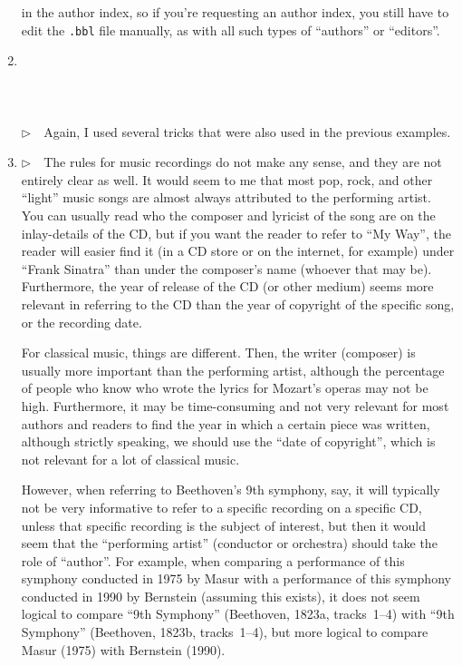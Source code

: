 \documentclass{article}
\newcommand{\EM}{\ensuremath{\triangleright\quad}}
\newcommand{\fname}[1]{\texttt{#1}}%
\begin{document}
\begin{enumerate}
      in the author index, so if you're requesting an author index,
      you still have to edit the \fname{.bbl} file manually, as with
      all such types of ``authors'' or ``editors''.
\item \cite{ex68} \\ \cite{ex68}\\ \\ \\
      \EM Again, I used several tricks that were also used in the previous
      examples.
\item \EM The rules for music recordings do not make any sense, and they
      are not entirely clear as well. It would seem to me that
      most pop, rock, and other ``light'' music songs are almost always
      attributed to the performing artist. You can usually read who the
      composer and lyricist of the song are on the inlay-details
      of the CD, but if you want the reader to refer to ``My Way'',
      the reader will easier find it (in a CD store or on the
      internet, for example) under ``Frank Sinatra'' than under
      the composer's name (whoever that may be). Furthermore, the
      year of release of the CD (or other medium) seems more relevant
      in referring to the CD than the year of copyright of the
      specific song, or the recording date.

      For classical music, things are different. Then, the writer (composer)
      is usually more important than the performing artist, although
      the percentage of people who know who wrote the lyrics for
      Mozart's operas may not be high. Furthermore, it may be
      time-consuming and not very relevant for most authors and
      readers to find the year in which a certain piece was written,
      although strictly speaking, we should use the ``date of copyright'',
      which is not relevant for a lot of classical music.

      However, when referring to Beethoven's 9th symphony, say, it will
      typically not be very informative to refer to a specific recording on a
      specific CD, unless that specific recording is the subject of interest,
      but then it would seem that the ``performing artist'' (conductor or
      orchestra) should take the role of ``author''. For example, when
      comparing a performance of this symphony conducted in 1975 by Masur with
      a performance of this symphony conducted in 1990 by Bernstein (assuming
      this exists), it does not seem logical to compare ``9th Symphony''
      (Beethoven, 1823a, tracks~1--4) with ``9th Symphony'' (Beethoven, 1823b,
      tracks~1--4), but more logical to compare Masur (1975) with
      Bernstein (1990).


\end{enumerate}
\end{document}
